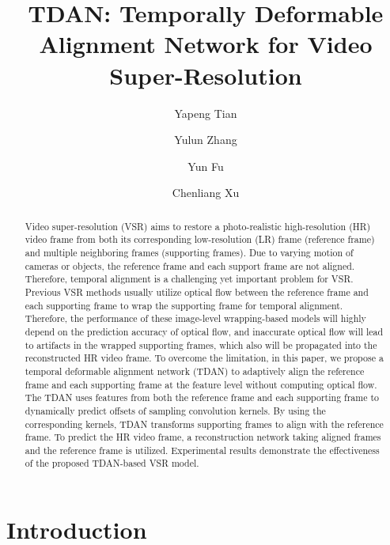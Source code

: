 \documentclass[10pt,twocolumn,letterpaper]{article}
\begin{document}
\title{TDAN: Temporally Deformable Alignment Network for Video Super-Resolution}

\author[1]{Yapeng Tian}
\author[2]{Yulun Zhang}
\author[2,3]{Yun Fu}
\author[1]{Chenliang Xu}
\maketitle


\begin{abstract}
Video super-resolution (VSR) aims to restore a photo-realistic high-resolution (HR) video frame from both its corresponding low-resolution (LR) frame (reference frame) and multiple neighboring frames (supporting frames). Due to varying motion of cameras or objects, the reference frame and each support frame are not aligned. Therefore, temporal alignment is a challenging yet important problem for VSR. Previous VSR methods usually utilize optical flow between the reference frame and each supporting frame to wrap the supporting frame for temporal alignment. Therefore, the performance of these image-level wrapping-based models will highly depend on the prediction accuracy of optical flow, and inaccurate optical flow will lead to artifacts in the wrapped supporting frames, which also will be propagated into the reconstructed HR video frame. To overcome the limitation, in this paper, we propose a temporal deformable alignment network (TDAN) to adaptively align the reference frame and each supporting frame at the feature level without computing optical flow. The TDAN uses features from both the reference frame and each supporting frame to dynamically predict offsets of sampling convolution kernels. By using the corresponding kernels, TDAN transforms supporting frames to align with the reference frame. To predict the HR video frame, a reconstruction network taking aligned frames and the reference frame is utilized.  Experimental results demonstrate the effectiveness of the proposed TDAN-based VSR model.
\end{abstract}

\section{Introduction}
\end{document}
